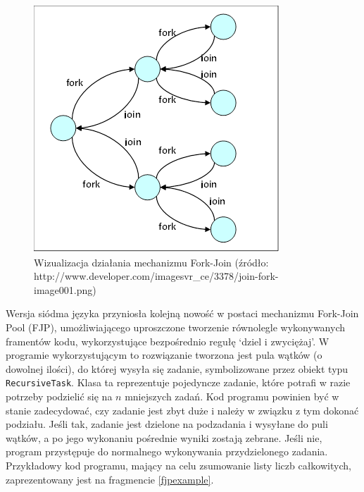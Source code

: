 \documentclass[12pt]{extarticle}
\begin{document}
\begin{figure}[h]
\centering
\includegraphics{forkjoin.png}
\caption{Wizualizacja działania mechanizmu Fork-Join (źródło: http://www.developer.com/imagesvr\_ce/3378/join-fork-image001.png)}
\label{fig:forkjoin}
\end{figure}

    Wersja siódma języka przyniosła kolejną nowość w postaci mechanizmu Fork-Join Pool (FJP), umożliwiającego uproszczone tworzenie równolegle wykonywanych framentów kodu, wykorzystujące bezpośrednio regułę `dziel i zwyciężaj'. W programie wykorzystującym to rozwiązanie tworzona jest pula wątków (o dowolnej ilości), do której wysyła się zadanie, symbolizowane przez obiekt typu \texttt{RecursiveTask}. Klasa ta reprezentuje pojedyncze zadanie, które potrafi w razie potrzeby podzielić się na $ n $ mniejszych zadań. Kod programu powinien być w stanie zadecydować, czy zadanie jest zbyt duże i należy w związku z tym dokonać podziału. Jeśli tak, zadanie jest dzielone na podzadania i wysyłane do puli wątków, a po jego wykonaniu pośrednie wyniki zostają zebrane. Jeśli nie, program przystępuje do normalnego wykonywania przydzielonego zadania.  Przykładowy kod programu, mający na celu zsumowanie listy liczb całkowitych, zaprezentowany jest na fragmencie \ref{fjpexample}.
\end{document}

